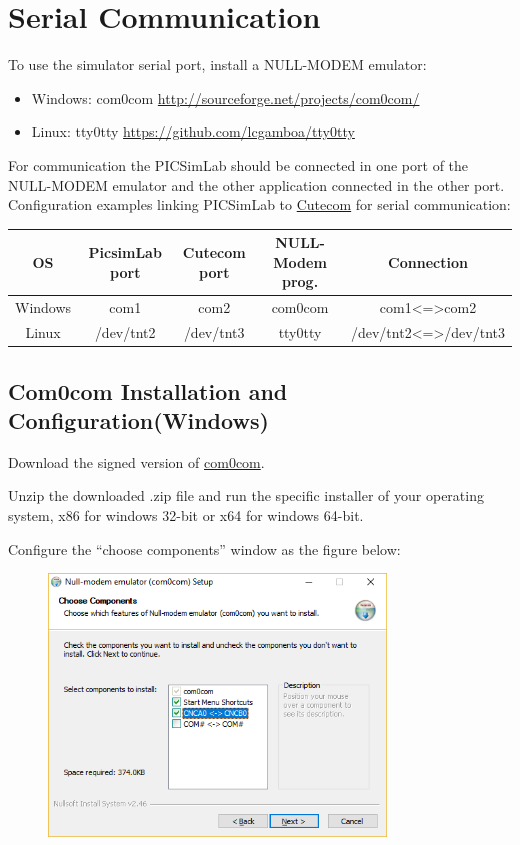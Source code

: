 

\chapter{Serial Communication \label{seriali}} \hypertarget{def:seriali}{}

To use the simulator serial port, install a NULL-MODEM emulator:
\begin{itemize}
 \item Windows: com0com \url{http://sourceforge.net/projects/com0com/}
 \item Linux: tty0tty  \url{https://github.com/lcgamboa/tty0tty}
 \end{itemize}

For communication the PICSimLab should be connected in one port of the NULL-MODEM emulator and the other application connected in the other port.
Configuration examples linking PICSimLab to \href{https://github.com/neundorf/CuteCom}{Cutecom} for serial communication:
 \vspace{0.5cm}
 
 \begin{tabular}{|c|c|c|c|c|}
 \hline OS&  PicsimLab port&  Cutecom port & NULL-Modem prog. &Connection\\
 \hline 
 \hline Windows&  com1 & com2 &com0com &com1<=>com2\\
 \hline Linux &  /dev/tnt2 & /dev/tnt3 &tty0tty &/dev/tnt2<=>/dev/tnt3\\
 \hline 
 \end{tabular}
 
 \section{Com0com Installation and Configuration(Windows)}
 
 Download the signed version of \href{https://sourceforge.net/projects/com0com/files/com0com/3.0.0.0/com0com-3.0.0.0-i386-and-x64-signed.zip/download}{com0com}.
 
Unzip the downloaded .zip file and run the specific installer of your operating system, x86 for windows 32-bit or x64 for windows 64-bit.
 
Configure the ``choose components'' window as the figure below:
 \begin{figure}[H]
\center
\includegraphics[width=0.8\textwidth]{img/com0com1.png} 
\end{figure} 


